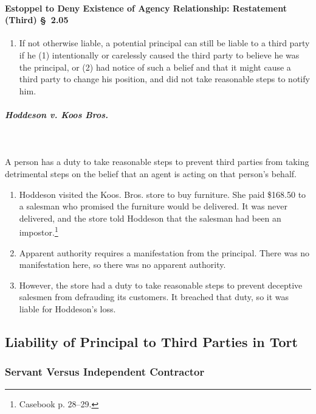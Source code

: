 \paragraph{Estoppel to Deny Existence of Agency Relationship: Restatement 
(Third) \S\ 2.05}

\begin{enumerate}
    \item If not otherwise liable, a potential principal can still be liable 
    to a third party if he (1) intentionally or carelessly caused the third 
    party to believe he was the principal, or (2) had notice of such a belief 
    and that it might cause a third party to change his position, and did not 
    take reasonable steps to notify him.
\end{enumerate}

\paragraph{\emph{Hoddeson v. Koos Bros.}}
~\\\\
A person has a duty to take reasonable steps to prevent third parties from taking 
detrimental steps on the belief that an agent is acting on that person's 
behalf.

\begin{enumerate}
    \item Hoddeson visited the Koos. Bros. store to buy furniture. She paid 
    \$168.50 to a salesman who promised the furniture would be delivered. It 
    was never delivered, and the store told Hoddeson that the salesman had 
    been an impostor.\footnote{Casebook p. 28--29.}
    \item Apparent authority requires a manifestation from the principal. 
    There was no manifestation here, so there was no apparent authority.
    \item However, the store had a duty to take reasonable steps to prevent 
    deceptive salesmen from defrauding its customers. It breached that duty, 
    so it was liable for Hoddeson's loss.
\end{enumerate}

\newpage %

\subsection{Liability of Principal to Third Parties in Tort}

\subsubsection{Servant Versus Independent Contractor}

